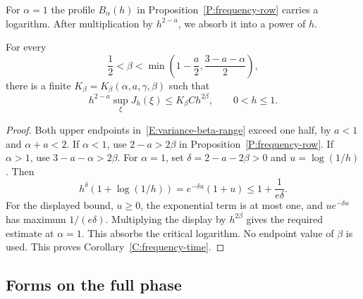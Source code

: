 For $\alpha = 1$ the profile $B_\alpha(h)$ in
Proposition~\ref{P:frequency-row} carries a logarithm. After multiplication
by $h^{2-a}$, we absorb it into a power of $h$.

\begin{corollary}\label{C:frequency-time}
  For every
  \begin{equation}\label{E:variance-beta-range}
    \frac12 < \beta < \min\left(1-\frac a2,
    \frac{3-a-\alpha}{2}\right),
  \end{equation}
  there is a finite $K_\beta = K_\beta(\alpha,a,\gamma,\beta)$ such that
  \begin{equation}\label{E:frequency-time-bound}
    h^{2-a}\sup_\xi J_h(\xi) \le K_\beta C h^{2\beta},
    \qquad 0 < h \le 1.
  \end{equation}
\end{corollary}

\begin{proof}
  Both upper endpoints in~\eqref{E:variance-beta-range} exceed one half, by $a <
  1$ and $\alpha+a < 2$. If $\alpha < 1$, use $2-a > 2\beta$ in
  Proposition~\ref{P:frequency-row}. If $\alpha > 1$, use $3-a-\alpha > 2\beta$.
  For $\alpha = 1$, set $\delta = 2-a-2\beta > 0$ and $u = \log(1/h)$. Then
  \[
    h^\delta(1+\log(1/h))
    = e^{-\delta u}(1+u) \le 1+\frac1{e\delta}.
  \]
  For the displayed bound, $u \ge 0$, the exponential term is at most one, and
  $u e^{-\delta u}$ has maximum $1/(e\delta)$. Multiplying the display by
  $h^{2\beta}$ gives the required estimate at $\alpha = 1$.
  This absorbs the critical logarithm. No endpoint value of $\beta$ is used.
  This proves Corollary~\ref{C:frequency-time}.
\end{proof}

\subsection{Forms on the full phase}

